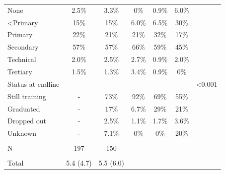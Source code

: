 \documentclass[
  11pt,
a4paper
]{report}
\begin{document}
\begin{table}[H]
\begin{threeparttable}
{\begin{tabular}[t]{lcccccc}
\hspace{1em}\hspace{1em}None & 2.5\% & 3.3\% & 0\% & 0.9\% & 6.0\% & \\
\hspace{1em}\hspace{1em}<Primary & 15\% & 15\% & 6.0\% & 6.5\% & 30\% & \\
\hspace{1em}\hspace{1em}Primary & 22\% & 21\% & 21\% & 32\% & 17\% & \\
\hspace{1em}\hspace{1em}Secondary & 57\% & 57\% & 66\% & 59\% & 45\% & \\
\hspace{1em}\hspace{1em}Technical & 2.0\% & 2.5\% & 2.7\% & 0.9\% & 2.0\% & \\
\hspace{1em}\hspace{1em}Tertiary & 1.5\% & 1.3\% & 3.4\% & 0.9\% & 0\% & \\
\hspace{1em}Status at endline &  &  &  &  &  & <0.001\\
\hspace{1em}\hspace{1em}Still training & - & 73\% & 92\% & 69\% & 55\% & \\
\hspace{1em}\hspace{1em}Graduated & - & 17\% & 6.7\% & 29\% & 21\% & \\
\hspace{1em}\hspace{1em}Dropped out & - & 2.5\% & 1.1\% & 1.7\% & 3.6\% & \\
\hspace{1em}\hspace{1em}Unknown & - & 7.1\% & 0\% & 0\% & 20\% & \\
\addlinespace[0.3em]
\hline
\multicolumn{7}{l}{\textbf{Firms}}\\
\hspace{1em}N & 197 & 150 &  &  &  & \\
\addlinespace[0.3em]
\multicolumn{7}{l}{\hspace{1em}Apprentices trained}\\
\hspace{1em}\hspace{1em}Total & 5.4 (4.7) & 5.5 (6.0) &  &  &  & \\

\end{tabular}}
\end{threeparttable}
\end{table}
\end{document}
